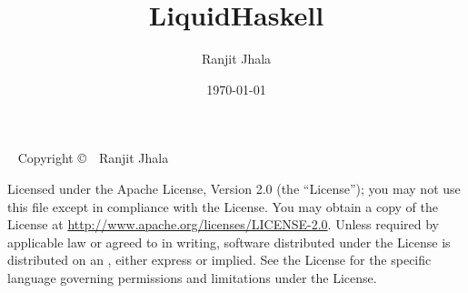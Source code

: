 \documentclass{tufte-book}
\title{LiquidHaskell}
\author{Ranjit Jhala}
\date{\today}
\begin{document}
\maketitle


\newpage

\begin{fullwidth}
~\vfill
\thispagestyle{empty}
\setlength{\parindent}{0pt}
\setlength{\parskip}{\baselineskip}
Copyright \copyright\ \the\year\ Ranjit Jhala

\par{}

\par Licensed under the Apache License, Version 2.0 (the ``License''); you may not
use this file except in compliance with the License. You may obtain a copy
of the License at \url{http://www.apache.org/licenses/LICENSE-2.0}. Unless
required by applicable law or agreed to in writing, software distributed
under the License is distributed on an , either express or implied. See the
License for the specific language governing permissions and limitations
under the License.


\end{fullwidth}

{
\setcounter{tocdepth}{5}
\tableofcontents
}

\listoftables

\listoffigures











\end{document}
